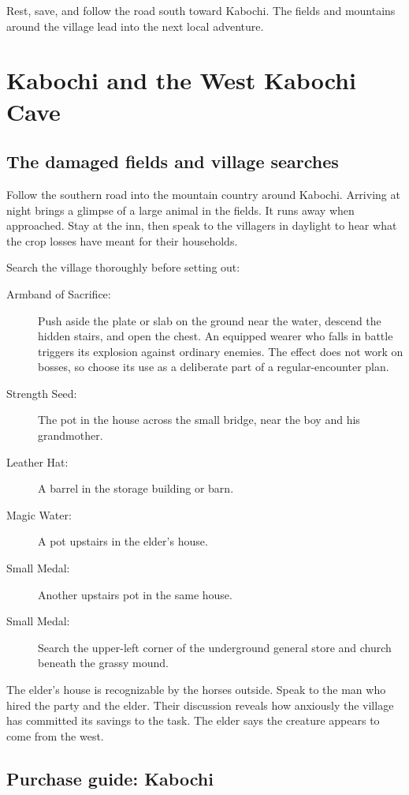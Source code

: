Rest, save, and follow the road south toward Kabochi. The fields and
mountains around the village lead into the next local adventure.

\section{Kabochi and the West Kabochi Cave}

\subsection*{The damaged fields and village searches}

Follow the southern road into the mountain country around Kabochi.
Arriving at night brings a glimpse of a large animal in the fields.
It runs away when approached. Stay at the inn, then speak to the
villagers in daylight to hear what the crop losses have meant for
their households.

Search the village thoroughly before setting out:
\begin{description}
  \item[Armband of Sacrifice:] Push aside the plate or slab on the
    ground near the water, descend the hidden stairs, and open the chest.
    An equipped wearer who falls in battle triggers its explosion against
    ordinary enemies. The effect does not work on bosses, so choose its
    use as a deliberate part of a regular-encounter plan.
  \item[Strength Seed:] The pot in the house across the small bridge,
    near the boy and his grandmother.
  \item[Leather Hat:] A barrel in the storage building or barn.
  \item[Magic Water:] A pot upstairs in the elder's house.
  \item[Small Medal:] Another upstairs pot in the same house.
  \item[Small Medal:] Search the upper-left corner of the underground
    general store and church beneath the grassy mound.
\end{description}

The elder's house is recognizable by the horses outside. Speak to the
man who hired the party and the elder. Their discussion reveals how
anxiously the village has committed its savings to the task. The elder
says the creature appears to come from the west.

\subsection*{Purchase guide: Kabochi}

